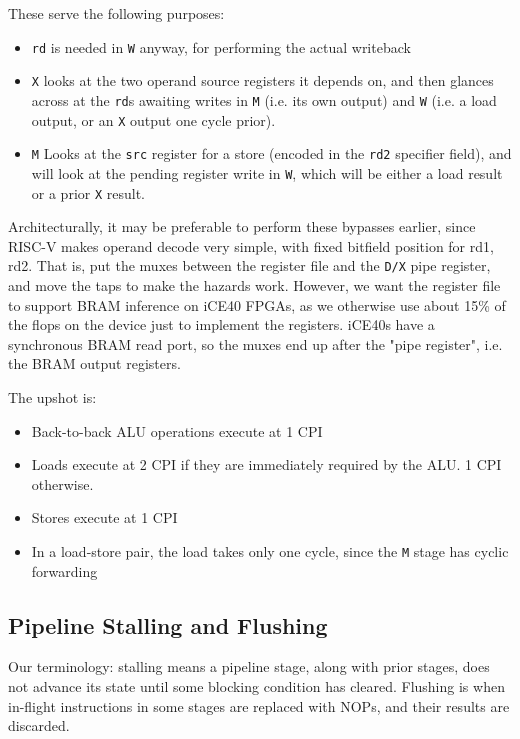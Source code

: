 \documentclass{article}
\begin{document}
These serve the following purposes:

\begin{itemize}
	\item \texttt{rd} is needed in \texttt{W} anyway, for performing the actual writeback
	\item \texttt{X} looks at the two operand source registers it depends on, and then glances across at the \texttt{rd}s awaiting writes in \texttt{M} (i.e. its own output) and \texttt{W} (i.e. a load output, or an \texttt{X} output one cycle prior).
	\item \texttt{M} Looks at the \texttt{src} register for a store (encoded in the \texttt{rd2} specifier field), and will look at the pending register write in \texttt{W}, which will be either a load result or a prior \texttt{X} result.
\end{itemize}

Architecturally, it may be preferable to perform these bypasses earlier, since RISC-V makes operand decode very simple, with fixed bitfield position for rd1, rd2. That is, put the muxes between the register file and the \texttt{D/X} pipe register, and move the taps to make the hazards work. However, we want the register file to support BRAM inference on iCE40 FPGAs, as we otherwise use about 15\% of the flops on the device just to implement the registers. iCE40s have a synchronous BRAM read port, so the muxes end up after the "pipe register", i.e. the BRAM output registers.

The upshot is:

\begin{itemize}
	\item Back-to-back ALU operations execute at 1 CPI
	\item Loads execute at 2 CPI if they are immediately required by the ALU. 1 CPI otherwise.
	\item Stores execute at 1 CPI
	\item In a load-store pair, the load takes only one cycle, since the \texttt{M} stage has cyclic forwarding
\end{itemize}

\subsection{Pipeline Stalling and Flushing}
\label{section:stalling_flushing}

Our terminology: stalling means a pipeline stage, along with prior stages, does not advance its state until some blocking condition has cleared. Flushing is when in-flight instructions in some stages are replaced with NOPs, and their results are discarded.
\end{document}
